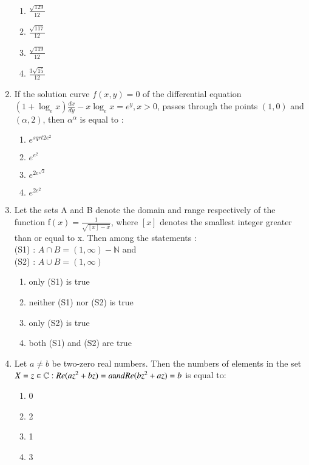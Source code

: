 \documentclass[journal,12pt,onecolumn]{IEEEtran}
\theoremstyle{remark}
\begin{document}
\begin{enumerate}
\begin{enumerate}
        \item $\frac{\sqrt{129}}{12}$ 
        \item $\frac{\sqrt{117}}{12}$
 \item $\frac{\sqrt{119}}{12}$ 
        \item $\frac{3\sqrt{15}}{12}$
\end{enumerate}
\item If the solution curve $f(x, y) = 0$ of the differential equation $(1+ \log_e x)\frac{dx}{dy} - x \log_e x =e^y, x>0$, passes through the points $(1, 0)$ and $(\alpha,2)$, then $\alpha ^{\alpha}$ is equal to :
        \begin{enumerate}
                \item $e^{sqrt{2}e^2}$
                \item $e^{e^2}$
                \item $e^{2e^{\sqrt{2}}}$ 
        \item $e^{2e^2}$    
\end{enumerate}
\item Let the sets A and B denote the domain and range respectively of the function f$(x)=\frac{1}{\sqrt{[x]-x}}$, where $[x]$ denotes the smallest integer greater than or equal to x. Then among the statements :\\
(S1) : $A \cap B = (1,\infty) - \mathbb{N}$ and \\
(S2) : $A \cup B = (1,\infty)$
 \begin{enumerate}
                \item only (S1) is true
                \item neither (S1) nor (S2) is true
                \item only (S2) is true
                \item both (S1) and (S2) are true
\end{enumerate}
\item Let $a \neq b$ be two-zero real numbers. Then the numbers of elements in the set \\ $X = {z \in \mathbb{C}:Re(az^2+bz)=a \text and Re(bz^2+az)=b}$ is equal to:
\begin{enumerate}
                \item 0
                \item 2
                \item 1
                \item 3
\end{enumerate}
 \end{enumerate}
\end{document}
